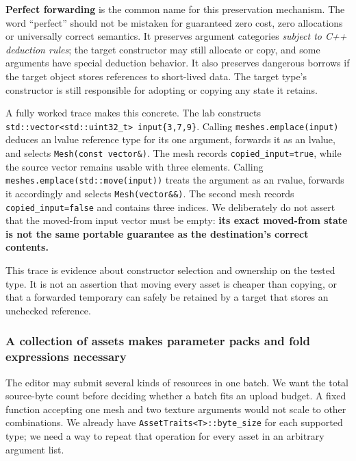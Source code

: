 \textbf{Perfect forwarding} is the common name for this preservation mechanism. The word ``perfect'' should not be mistaken for guaranteed zero cost, zero allocations or universally correct semantics. It preserves argument categories \emph{subject to C++ deduction rules}; the target constructor may still allocate or copy, and some arguments have special deduction behavior. It also preserves dangerous borrows if the target object stores references to short-lived data. The target type's constructor is still responsible for adopting or copying any state it retains.

A fully worked trace makes this concrete. The lab constructs \texttt{std::vector\textless{}std::uint32\_t\textgreater{}\ input\{3,7,9\}}. Calling \texttt{meshes.emplace(input)} deduces an lvalue reference type for its one argument, forwards it as an lvalue, and selects \texttt{Mesh(const\ vector\&)}. The mesh records \texttt{copied\_input=true}, while the source vector remains usable with three elements. Calling \texttt{meshes.emplace(std::move(input))} treats the argument as an rvalue, forwards it accordingly and selects \texttt{Mesh(vector\&\&)}. The second mesh records \texttt{copied\_input=false} and contains three indices. We deliberately do not assert that the moved-from input vector must be empty: \textbf{its exact moved-from state is not the same portable guarantee as the destination's correct contents.}

This trace is evidence about constructor selection and ownership on the tested type. It is not an assertion that moving every asset is cheaper than copying, or that a forwarded temporary can safely be retained by a target that stores an unchecked reference.

\subsubsection{A collection of assets makes parameter packs and fold expressions necessary}\label{a-collection-of-assets-makes-parameter-packs-and-fold-expressions-necessary}

The editor may submit several kinds of resources in one batch. We want the total source-byte count before deciding whether a batch fits an upload budget. A fixed function accepting one mesh and two texture arguments would not scale to other combinations. We already have \texttt{AssetTraits\textless{}T\textgreater{}::byte\_size} for each supported type; we need a way to repeat that operation for every asset in an arbitrary argument list.

